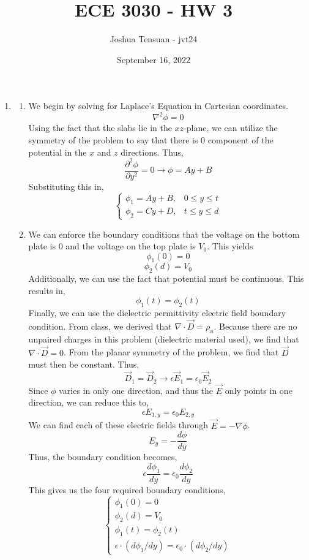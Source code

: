 \documentclass[12pt]{article}
\begin{document}
\usetikzlibrary{scopes}
\def\iangle{35} %

\def\down{-90}
\def\arcr{0.5cm} %


\title{ECE 3030 - HW 3}
\author{Joshua Tensuan - jvt24}
\date{September 16, 2022}
\maketitle


\begin{enumerate}
	\item [3.1]
	\begin{enumerate}
		\item [a.]
		We begin by solving for Laplace's Equation in Cartesian coordinates.
		\[\nabla^2\phi = 0\]
		Using the fact that the slabs lie in the $xz$-plane, we can utilize the symmetry of the problem to say that there is $0$ component of the potential in the $x$ and $z$ directions.
		Thus,
		\[\frac{\partial^2 \phi}{\partial y^2}=0 \to \phi = Ay + B\]
		Substituting this in,
		\[\boxed{\begin{cases}
			\phi_1 = Ay+B, & 0 \leq y \leq t \\ 
			\phi_2 = Cy +D, & t \leq y \leq d	
		\end{cases}}\]

		\item [b.]
		We can enforce the boundary conditions that the voltage on the bottom plate is $0$ and the voltage on the top plate is $V_0$.
		This yields
		\[\phi_1(0)=0\]
		\[\phi_2(d)=V_0\]
		Additionally, we can use the fact that potential must be continuous.
		This results in,
		\[\phi_1(t)=\phi_2(t)\]
		Finally, we can use the dielectric permittivity electric field boundary condition.
		From class, we derived that $\nabla \cdot \vec D = \rho_u$.
		Because there are no unpaired charges in this problem (dielectric material used), we find that $\nabla \cdot \vec D = 0$.
		From the planar symmetry of the problem, we find that $\vec D$ must then be constant.
		Thus,
		\[\vec D_1 = \vec D_2 \to \epsilon\vec E_1 = \epsilon_0\vec E_2\]
		Since $\phi$ varies in only one direction, and thus the $\vec E$ only points in one direction, we can reduce this to,
		\[\epsilon E_{1,y}=\epsilon_0 E_{2,y}\]
		We can find each of these electric fields through $\vec E = -\nabla \phi$.
		\[E_y = -\frac{d\phi}{dy}\]
		Thus, the boundary condition becomes,
		\[\epsilon\frac{d\phi_1}{dy} = \epsilon_0 \frac{d\phi_2}{dy}\]
		This gives us the four required boundary conditions,
		\[\boxed{\begin{cases}
			\phi_1(0) = 0 \\ 
			\phi_2(d)= V_0 \\ 
			\phi_1(t)=\phi_2(t) \\ 
			\epsilon \cdot(d\phi_1/dy)=\epsilon_0\cdot (d\phi_2/dy)	
		\end{cases}}\]


\end{enumerate}
\end{enumerate}
\end{document}
